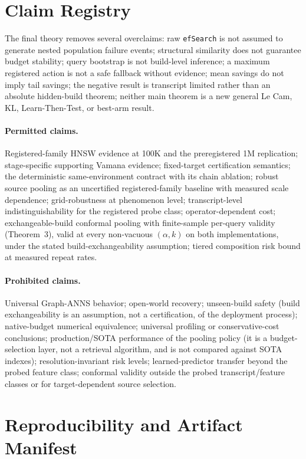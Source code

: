 \documentclass{article}
\begin{document}
\section{Claim Registry}
\label{app:claims}

The final theory removes several overclaims: raw \texttt{efSearch} is not assumed to generate nested
population failure events; structural similarity does not guarantee budget stability; query bootstrap is
not build-level inference; a maximum registered action is not a safe fallback without evidence; mean
savings do not imply tail savings; the negative result is transcript limited rather than an absolute
hidden-build theorem; neither main theorem is a new general Le Cam, KL, Learn-Then-Test, or best-arm
result.

\paragraph{Permitted claims.}
Registered-family HNSW evidence at 100K and the preregistered 1M replication; stage-specific supporting
Vamana evidence; fixed-target certification semantics; the deterministic same-environment contract with its
chain ablation; robust source pooling as an uncertified registered-family baseline with measured scale
dependence; grid-robustness at phenomenon level; transcript-level indistinguishability for the registered
probe class; operator-dependent cost; exchangeable-build conformal pooling with finite-sample per-query
validity (Theorem~3), valid at every non-vacuous $(\alpha,k)$ on both implementations, under the stated
build-exchangeability assumption; tiered composition risk bound at measured repeat rates.

\paragraph{Prohibited claims.}
Universal Graph-ANNS behavior; open-world recovery; unseen-build safety (build exchangeability is an
assumption, not a certification, of the deployment process); native-budget numerical equivalence;
universal profiling or conservative-cost conclusions; production/SOTA performance of the pooling policy
(it is a budget-selection layer, not a retrieval algorithm, and is not compared against SOTA indexes);
resolution-invariant risk levels; learned-predictor transfer beyond the probed feature class; conformal
validity outside the probed transcript/feature classes or for target-dependent source selection.

\section{Reproducibility and Artifact Manifest}
\label{app:repro}
\end{document}
